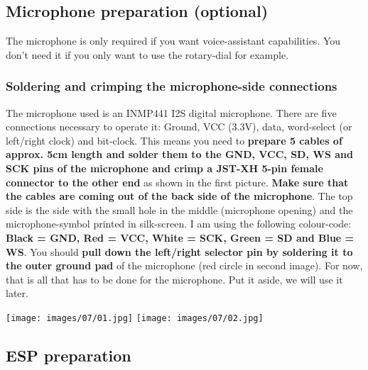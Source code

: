 \documentclass[]{article}
\begin{document}
\newpage
\subsection{Microphone preparation (optional)}
The microphone is only required if you want voice-assistant capabilities. You don't need it if you only want to use the rotary-dial for example.
\subsubsection{Soldering and crimping the microphone-side connections}
\begin{minipage}[t]{0.4\linewidth}
	\vspace{0pt}
	The microphone used is an INMP441 I2S digital microphone. There are five connections necessary to operate it: Ground, VCC (3.3V), data, word-select (or left/right clock) and bit-clock. 
	\newline
	\newline
	This means you need to \textbf{prepare 5 cables of approx. 5cm length and solder them to the GND, VCC, SD, WS and SCK pins of the microphone and crimp a JST-XH 5-pin female connector to the other end} as shown in the first picture. \textbf{Make sure that the cables are coming out of the back side of the microphone}. 
	\newline
	\newline
	The top side is the side with the small hole in the middle (microphone opening) and the microphone-symbol printed in silk-screen. I am using the following colour-code: \textbf{Black = GND, Red = VCC, White = SCK, Green = SD and Blue = WS}. You should \textbf{pull down the left/right selector pin by soldering it to the outer ground pad} of the microphone (red circle in second image).
	\newline
	\newline
	For now, that is all that has to be done for the microphone. Put it aside, we will use it later.
\end{minipage}
\hfill
\begin{minipage}[t]{0.5\linewidth}
	\vspace{0pt}
	\texttt{[image: images/07/01.jpg]}
	\texttt{[image: images/07/02.jpg]}
\end{minipage}




\subsection{ESP preparation}
\end{document}
